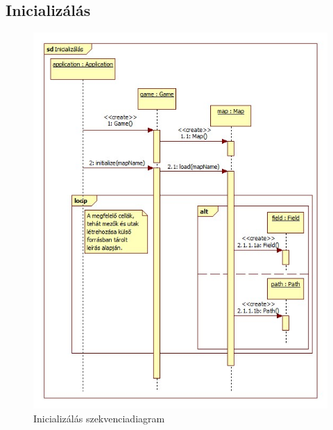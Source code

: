 \subsection{Inicializálás}
\begin{figure}[H]
\begin{center}
\includegraphics[width=17cm]{chapters/chapter05/images/sd_Inicializalas.jpg}
\caption{Inicializálás szekvenciadiagram}
\label{fig:sd_Inicializalas}
\end{center}
\end{figure}

